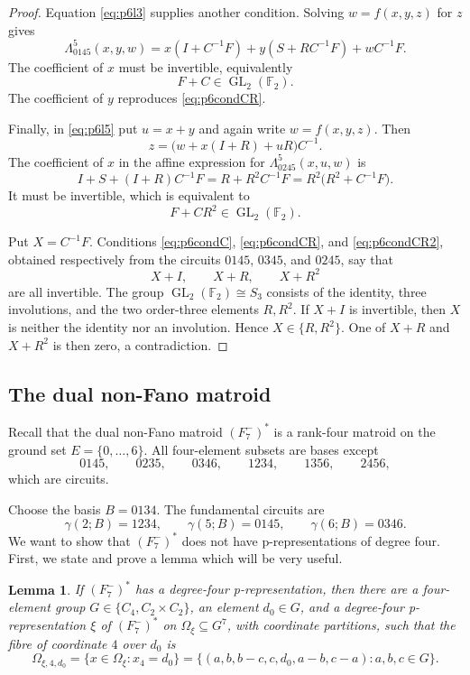 \documentclass[preprint,12pt]{elsarticle}
\newtheorem{lemma}[theorem]{Lemma}
\theoremstyle{definition}
\newcommand{\F}{\mathbb F}
\newcommand{\GL}{\operatorname{GL}}
\begin{document}
\begin{proof}
Equation \eqref{eq:p6l3} supplies another condition. Solving
$w=f(x,y,z)$ for $z$ gives
\[
\Lambda_{0145}^5(x,y,w)=x(I+C^{-1}F)+y(S+RC^{-1}F)+wC^{-1}F.
\]
The coefficient of $x$ must be invertible, equivalently
\begin{equation}\label{eq:p6condC}
F+C\in\GL_2(\F_2).
\end{equation}
The coefficient of $y$ reproduces \eqref{eq:p6condCR}.

Finally, in \eqref{eq:p6l5} put $u=x+y$ and again write $w=f(x,y,z)$.
Then
\[
z=\bigl(w+x(I+R)+uR\bigr)C^{-1}.
\]
The coefficient of $x$ in the affine expression for
$\Lambda_{0245}^{5}(x,u,w)$ is
\[
I+S+(I+R)C^{-1}F
=R+R^2C^{-1}F
=R^2\bigl(R^2+C^{-1}F\bigr).
\]
It must be invertible, which is equivalent to
\begin{equation}\label{eq:p6condCR2}
F+CR^2\in\GL_2(\F_2).
\end{equation}

Put $X=C^{-1}F$. Conditions \eqref{eq:p6condC}, \eqref{eq:p6condCR}, and
\eqref{eq:p6condCR2}, obtained respectively from the circuits $0145$, $0345$,
and $0245$, say that
\[
X+I,\qquad X+R,\qquad X+R^2
\]
are all invertible. The group $\GL_2(\F_2)\cong S_3$ consists of the identity,
three involutions, and the two order-three elements $R,R^2$. If $X+I$ is
invertible, then $X$ is neither the identity nor an involution. Hence
$X\in\{R,R^2\}$. One of $X+R$ and $X+R^2$ is then zero, a contradiction.
\end{proof}

\subsection{The dual non-Fano matroid}\label{sec:dnf}

Recall that the dual non-Fano matroid $(F_7^-)^*$ is a rank-four matroid on the ground set $E =\{0,\dots,6\}$. All four-element subsets are bases except
\[
0145, \qquad 0235, \qquad 0346, \qquad 1234, \qquad 1356, \qquad 2456,
\]
which are circuits.


Choose the basis $B=0134$. The fundamental circuits are
\[
\gamma(2;B)=1234,\qquad \gamma(5;B)=0145,\qquad \gamma(6;B)=0346.
\]
We want to show that $(F_7^-)^*$ does not have p-representations of degree four. 
First, we state and prove a lemma which will be very useful.

\begin{lemma}\label{lem: projection and MK4}
	 If $(F_7^-)^*$ has a degree-four p-representation, then there are a
	four-element group $G\in \{C_4,C_2 \times C_2\}$, an element $d_0 \in G$, and
	a degree-four p-representation $\xi$ of $(F_7^-)^*$ on
	$\Omega_{\xi} \subseteq G^7$, with coordinate partitions, such that the fibre
	of coordinate $4$ over $d_0$ is
	\[
	\Omega_{\xi,4,d_0} = \{x \in \Omega_{\xi}:x_4 = d_0\}
	= \{(a,b,b-c,c,d_0,a-b,c-a):a,b,c\in G\}.
	\]

\end{lemma}
\end{document}
